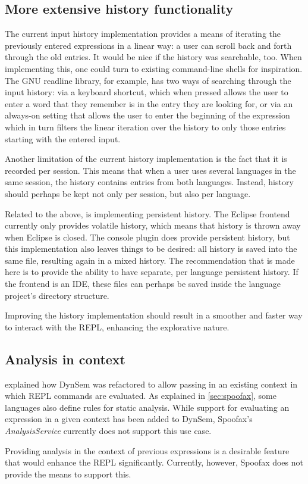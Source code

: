 \subsection{More extensive history functionality}

The current input history implementation provides a means of iterating the
previously entered expressions in a linear way: a user can scroll back and forth
through the old entries. It would be nice if the history was searchable, too.
When implementing this, one could turn to existing command-line shells for
inspiration. The GNU readline library, for example, has two ways of searching
through the input history: via a keyboard shortcut, which when pressed allows
the user to enter a word that they remember is in the entry they are looking
for, or via an always-on setting that allows the user to enter the beginning of
the expression which in turn filters the linear iteration over the
history to only those entries starting with the entered input.

Another limitation of the current history implementation is the fact that it is
recorded per session. This means that when a user uses several languages in the
same session, the history contains entries from both languages. Instead,
history should perhaps be kept not only per session, but also per language.

Related to the above, is implementing persistent history. The Eclipse frontend
currently only provides volatile history, which means that history is thrown
away when Eclipse is closed. The console plugin does provide persistent history,
but this implementation also leaves things to be desired: all history is saved
into the same file, resulting again in a mixed history. The recommendation that
is made here is to provide the ability to have separate, per language
persistent history. If the frontend is an IDE, these files can perhaps be saved
inside the language project's directory structure.

Improving the history implementation should result in a smoother and
faster way to interact with the REPL, enhancing the explorative nature.

\subsection{Analysis in context}

 explained how DynSem was refactored to allow passing
in an existing context in which REPL commands are evaluated. As explained
in \cref{sec:spoofax}, some languages also define rules for static analysis.
While support for evaluating an expression in a given context has been added to
DynSem, Spoofax's \textit{AnalysisService} currently does not support this
use case.

Providing analysis in the context of previous expressions is a desirable
feature that would enhance the REPL significantly. Currently, however,
Spoofax does not provide the means to support this.

